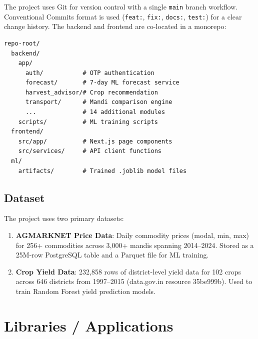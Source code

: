 \documentclass[12pt,a4paper]{report}
\begin{document}
The project uses Git for version control with a single \texttt{main} branch workflow.
Conventional Commits format is used (\texttt{feat:}, \texttt{fix:}, \texttt{docs:},
\texttt{test:}) for a clear change history. The backend and frontend are co-located in a
monorepo:

\begin{verbatim}
repo-root/
  backend/
    app/
      auth/           # OTP authentication
      forecast/       # 7-day ML forecast service
      harvest_advisor/# Crop recommendation
      transport/      # Mandi comparison engine
      ...             # 14 additional modules
    scripts/          # ML training scripts
  frontend/
    src/app/          # Next.js page components
    src/services/     # API client functions
  ml/
    artifacts/        # Trained .joblib model files
\end{verbatim}

\subsection{Dataset}

The project uses two primary datasets:

\begin{enumerate}
    \item \textbf{AGMARKNET Price Data}: Daily commodity prices (modal, min, max) for
    256+ commodities across 3,000+ mandis spanning 2014--2024. Stored as a 25M-row
    PostgreSQL table and a Parquet file for ML training.
    \item \textbf{Crop Yield Data}: 232,858 rows of district-level yield data for 102 crops
    across 646 districts from 1997--2015 (data.gov.in resource 35be999b). Used to train
    Random Forest yield prediction models.
\end{enumerate}

\section{Libraries / Applications}
\end{document}
